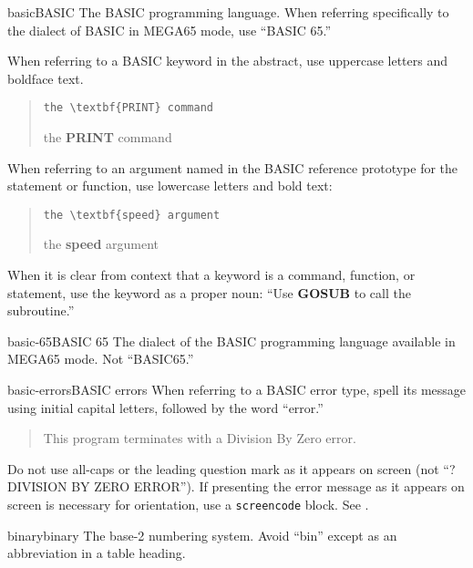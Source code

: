 \begin{sgentry}{basic}{BASIC}
    The BASIC programming language. When referring specifically to the dialect of BASIC in MEGA65 mode, use ``BASIC 65.''

    When referring to a BASIC keyword in the abstract, use uppercase letters and boldface text.

    \begin{quote}
        \texttt{the {\textbackslash}textbf\{PRINT\} command}

        \hrulefill

        the \textbf{PRINT} command
    \end{quote}

    When referring to an argument named in the BASIC reference prototype for the statement or function, use lowercase letters and bold text:

    \begin{quote}
        \texttt{the {\textbackslash}textbf\{speed\} argument}

        \hrulefill

        the \textbf{speed} argument
    \end{quote}

    When it is clear from context that a keyword is a command, function, or statement, use the keyword as a proper noun: ``Use \textbf{GOSUB} to call the subroutine.''
\end{sgentry}

\begin{sgentry}{basic-65}{BASIC 65}
    The dialect of the BASIC programming language available in MEGA65 mode. Not ``BASIC65.''
\end{sgentry}

\begin{sgentry}{basic-errors}{BASIC errors}
    When referring to a BASIC error type, spell its message using initial capital letters, followed by the word ``error.''

    \begin{quote}
        This program terminates with a Division By Zero error.
    \end{quote}

    Do not use all-caps or the leading question mark as it appears on screen (not ``?DIVISION BY ZERO ERROR''). If presenting the error message as it appears on screen is necessary for orientation, use a \texttt{screencode} block. See .
\end{sgentry}

\begin{sgentry}{binary}{binary}
    The base-2 numbering system. Avoid ``bin'' except as an abbreviation in a table heading.
\end{sgentry}

